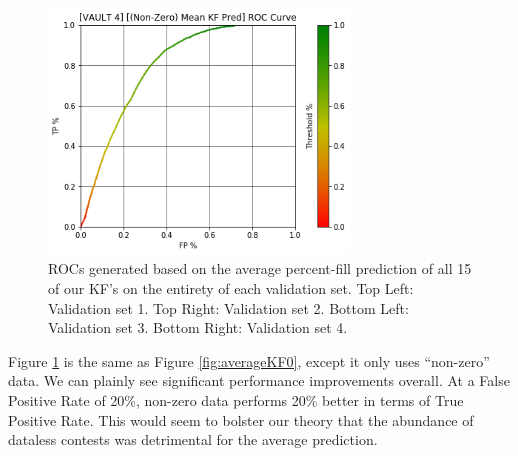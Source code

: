 \begin{figure}[h]
\includegraphics[width=8cm]{body/results/Graphs/JustSeries/1.PerformaceofMean/1.KF/Non-Zero/KFn0v4.png}
\caption{ROCs generated based on the average percent-fill prediction of all 15 of our KF's on the entirety of each validation set. Top Left: Validation set 1. Top Right: Validation set 2. Bottom Left: Validation set 3. Bottom Right: Validation set 4.}
\label{fig:averageKFn0}
\end{figure}

Figure \ref{fig:averageKFn0} is the same as Figure \ref{fig:averageKF0}, except it only uses ``non-zero'' data. We can plainly see significant performance improvements overall. At a False Positive Rate of 20\%, non-zero data performs 20\% better in terms of True Positive Rate. This would seem to bolster our theory that the abundance of dataless contests was detrimental for the average prediction.

\pagebreak

